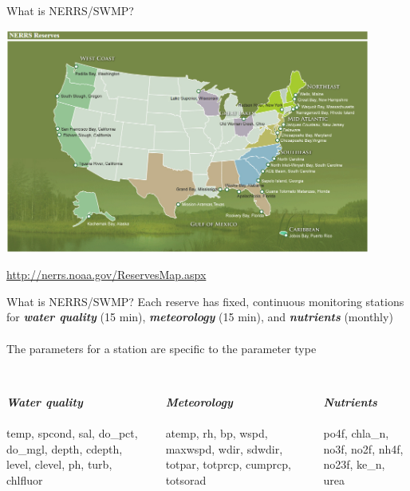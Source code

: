 \documentclass[serif]{beamer}\usepackage[]{graphicx}\usepackage[]{color}
\newcommand{\Bigtxt}[1]{\textbf{\textit{#1}}}
\begin{document}
\begin{frame}{What is NERRS/SWMP?}
\centerline{\includegraphics[width = 0.9\textwidth]{fig/NERRS_locations.png}}
\tiny
\flushright
\href{http://nerrs.noaa.gov/ReservesMap.aspx}{http://nerrs.noaa.gov/ReservesMap.aspx}
\end{frame}

\begin{frame}{What is NERRS/SWMP?}
Each reserve has fixed, continuous monitoring stations for \Bigtxt{water quality} (15 min), \Bigtxt{meteorology} (15 min), and \Bigtxt{nutrients} (monthly)\\~\\
The parameters for a station are specific to the parameter type \\~\\
\begin{columns}[t]
\begin{column}{0.3\textwidth}
\Bigtxt{Water quality} \\~\\
temp, spcond, sal, do\_pct, do\_mgl, depth, cdepth, level, clevel, ph, turb, chlfluor
\end{column}
\begin{column}{0.3\textwidth}
\Bigtxt{Meteorology} \\~\\
atemp, rh, bp, wspd, maxwspd, wdir, sdwdir, totpar, totprcp, cumprcp, totsorad \\~\\
\end{column}
\begin{column}{0.3\textwidth}
\Bigtxt{Nutrients} \\~\\
po4f, chla\_n, no3f, no2f, nh4f, no23f, ke\_n, urea
\end{column}
\end{columns}
\end{frame}
\end{document}
